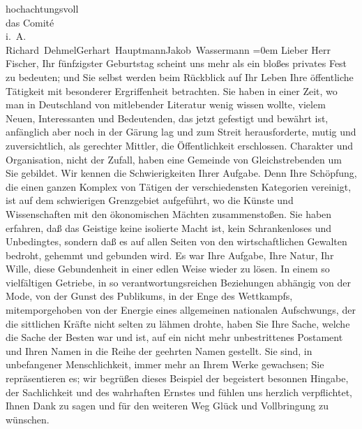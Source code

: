\pstart
           hochachtungsvoll{\\[\baselineskip]}das Comité{\\[\baselineskip]}i. A.{\\[\baselineskip]}\spacefill\mbox{Richard Dehmel\hspace*{1.5em}Gerhart Hauptmann\hspace*{1.5em}Jakob Wassermann}\pend
           \leftskip=0em{}\vspace{1em}
\pstart{}{\pb}Lieber Herr Fischer,\pend\vspace{0.5em}
\pstart
           Ihr fünfzigster Geburtstag scheint uns mehr als ein bloßes privates Fest zu bedeuten;
               und Sie selbst werden beim Rückblick auf Ihr Leben Ihre öffentliche Tätigkeit mit
               besonderer Ergriffenheit betrachten. Sie haben in einer Zeit, wo man in Deutschland von mitlebender Literatur wenig wissen
               wollte, vielem Neuen, Interessanten und Bedeutenden, das jetzt gefestigt und bewährt
               ist, anfänglich aber noch in der Gärung lag und zum Streit herausforderte, mutig und
               zuversichtlich, als gerechter Mittler, die Öffentlichkeit erschlossen. Charakter und
               Organisation, nicht der Zufall, haben eine Gemeinde von Gleichstrebenden um Sie
               gebildet. Wir kennen die Schwierigkeiten Ihrer Aufgabe. Denn Ihre Schöpfung, die
               einen ganzen Komplex von Tätigen der verschiedensten Kategorien vereinigt, ist auf
               dem schwierigen Grenzgebiet aufgeführt, wo die Künste und Wissenschaften mit den
               ökonomischen Mächten zusammenstoßen. Sie haben erfahren, daß das Geistige keine
               isolierte Macht ist, kein Schrankenloses und Unbedingtes, sondern daß es auf allen
               Seiten von den wirtschaftlichen Gewalten bedroht, gehemmt und gebunden wird. Es war
               Ihre Aufgabe, Ihre Natur, Ihr Wille, {\pb}diese Gebundenheit in einer edlen Weise wieder zu lösen. In einem so vielfältigen
               Getriebe, in so verantwortungsreichen Beziehungen abhängig von der Mode, von der
               Gunst des Publikums, in der Enge des Wettkampfs, mitemporgehoben von der Energie
               eines allgemeinen nationalen Aufschwungs, der die sittlichen Kräfte nicht selten zu
               lähmen drohte, haben Sie Ihre Sache, welche die Sache der Besten war und ist, auf ein
               nicht mehr unbestrittenes Postament und Ihren Namen in die Reihe der geehrten Namen
               gestellt. Sie sind, in unbefangener Menschlichkeit, immer mehr an Ihrem Werke
               gewachsen; Sie repräsentieren es; wir begrüßen dieses Beispiel der begeistert
               besonnen Hingabe, der Sachlichkeit und des wahrhaften Ernstes und fühlen uns herzlich
               verpflichtet, Ihnen Dank zu sagen und für den weiteren Weg Glück und Vollbringung zu
               wünschen.\pend
           
